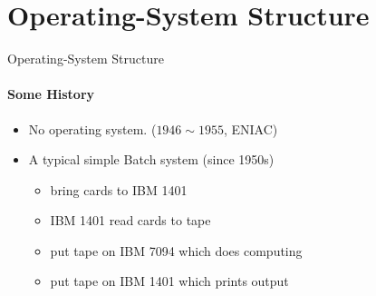 \documentclass[10pt]{beamer}
\begin{document}

\section[4.Structure]{Operating-System Structure}
\begin{frame}{Operating-System Structure}
\framesubtitle{Some History}
\begin{itemize} 
\item No operating system. ($1946\sim 1955$, ENIAC)
\item A typical simple \alert{Batch system} (since 1950s)
\begin{itemize}
\item bring cards to IBM 1401
\item IBM 1401 read cards to tape
\item put tape on IBM 7094 which does computing
\item put tape on IBM 1401 which prints output
\end{itemize}
\end{itemize}
\end{frame}
\end{document}
